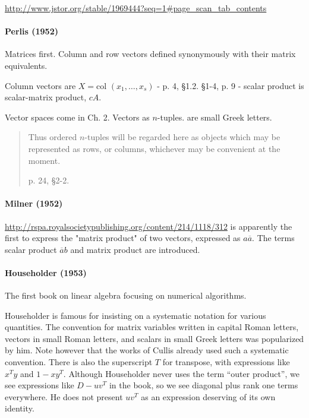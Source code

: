 \url{http://www.jstor.org/stable/1969444?seq=1#page_scan_tab_contents}


\paragraph{Perlis (1952)~\cite{Perlis1952}}

Matrices first. Column and row vectors defined synonymously with their matrix equivalents.

Column vectors are $X = \textrm{col }(x_1, \dots, x_s)$ - p. 4, \S 1.2.
\S 1-4, p. 9 - scalar product is scalar-matrix product, $c A$.

Vector spaces come in Ch. 2. Vectors as $n$-tuples. are small Greek letters.

\begin{quote}
Thus ordered $n$-tuples will be regarded here as objects which may be represented as rows, or columns, whichever may be convenient at the moment.

p. 24, \S2-2.
\end{quote}



\paragraph{Milner (1952)}

\url{http://rspa.royalsocietypublishing.org/content/214/1118/312}
is apparently the first to express the "matrix product" of two vectors, expressed as $a \overline{a}$.
The terms scalar product $\overline{a} b$ and matrix product are introduced.



\paragraph{Householder (1953)~\cite{Householder1953}}

The first book on linear algebra focusing on numerical algorithms.

Householder is famous for insisting on a systematic notation for various quantities.
The convention for matrix variables written in capital Roman letters, vectors in small Roman letters, and scalars in small Greek letters was popularized by him. Note however that the works of Cullis already used such a systematic convention.
There is also the superscript $T$ for transpose, with expressions like $x^T y$ and $1 - x y^T$.
Although Householder never uses the term ``outer product'', we see expressions like $D - u v^T$ in the book, so we see diagonal plus rank one terms everywhere. He does not present $u v^T$ as an expression deserving of its own identity.

